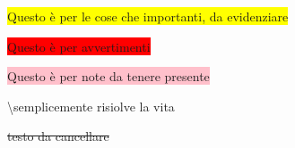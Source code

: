 \colorbox{yellow}{Questo è per le cose che importanti, da evidenziare}

\colorbox{red}{Questo è per avvertimenti}

\colorbox{pink}{Questo è per note da tenere presente}

\textbackslash{semplicemente risiolve la vita}

\sout{testo da cancellare}


\makeatletter
\newcommand{\sqbox}{%
    \collectbox{%
        \@tempdima=\dimexpr\width-\totalheight\relax
        \ifdim\@tempdima<\z@
            \fbox{\hbox{\hspace{-.5\@tempdima}\BOXCONTENT\hspace{-.5\@tempdima}}}%
        \else
            \ht\collectedbox=\dimexpr\ht\collectedbox+.5\@tempdima\relax
            \dp\collectedbox=\dimexpr\dp\collectedbox+.5\@tempdima\relax
            \fbox{\BOXCONTENT}%
        \fi
    }%
}
\makeatother



